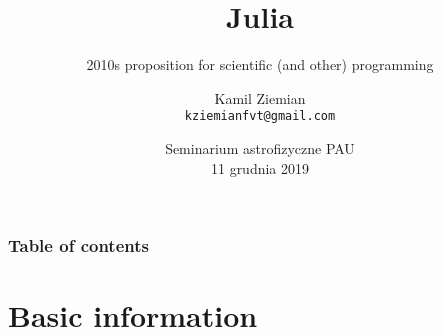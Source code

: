 \documentclass[10pt,t]{beamer}
\title{Julia}
\subtitle{2010s proposition for scientific (and other) programming}
\author{Kamil Ziemian \\
  \texttt{kziemianfvt@gmail.com}}
\institute{Uniwersytet Jagielloński w~Krakowie}
\date[11 December 2018]{Seminarium astrofizyczne PAU \\
  11 grudnia 2019}
\begin{document}





\maketitle %





\begin{frame}
  \frametitle{Table of contents}


  \tableofcontents %

\end{frame}










\section{Basic information}
\end{document}
